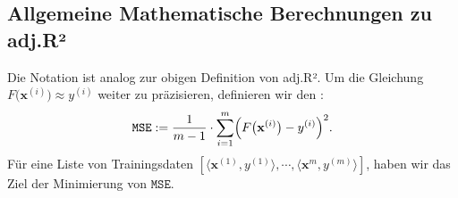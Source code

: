 \documentclass[12pt]{article}
\begin{document}
\subsection{Allgemeine Mathematische Berechnungen zu adj.R²}
%

Die Notation ist analog zur obigen Definition von adj.R². Um die Gleichung $F\bigl(\mathbf{x}^{(i)}\bigr) \approx y^{(i)}$ weiter zu präzisieren, definieren wir den {\color{blue}{gemittelten quadratischen Fehler "mean squared error"}}: 
\begin{equation}
  \label{eq:squared-error-1}
  \mathtt{MSE} := \frac{1}{m-1} \cdot \sum\limits_{i=1}^{m} \Bigl(F\bigl(\mathbf{x}^{(i)}\bigr) - y^{(i)}\Bigr)^2. 
\end{equation}
Für eine Liste von Trainingsdaten $[\langle \mathbf{x}^{(1)}, y^{(1)} \rangle, \cdots, \langle \mathbf{x}^{m}, y^{(m)} \rangle] $, haben wir das Ziel der Minimierung von $\mathtt{MSE}$.
%
\end{document}
